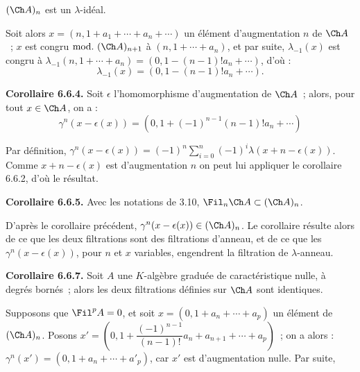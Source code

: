 \((\Ch A)_n\) est un \(\lambda\)-idéal.

Soit alors \(x=(n,1+a_1+\cdots+a_n+\cdots)\) un élément d'augmentation \(n\) de \(\Ch A\)~; \(x\) est congru \(\mathrm{mod.}\ (\Ch A)_{n+1}\) à \((n,1+\cdots+a_n)\), et par suite, \(\lambda_{-1}(x)\) est congru à \(\lambda_{-1}(n,1+\cdots+a_n)=(0,1-(n-1)!a_n+\cdots)\), d'où :
\[
  \lambda_{-1}(x)=(0,1-(n-1)!a_n+\cdots).
\]

\textbf{Corollaire 6.6.4.} Soit \(\epsilon\) l'homomorphisme d'augmentation de \(\Ch A\)~; alors, pour tout \(x\in\Ch A\), on a :
\[
  \gamma^n(x-\epsilon(x))
  =
  (0,1+(-1)^{n-1}(n-1)!a_n+\cdots)
\]

Par définition, \(\gamma^n(x-\epsilon(x))=(-1)^n\sum_{i=0}^n(-1)^i\lambda(x+n-\epsilon(x))\). Comme \(x+n-\epsilon(x)\) est d'augmentation \(n\) on peut lui appliquer le corollaire 6.6.2, d'où le résultat.

\textbf{Corollaire 6.6.5.} Avec les notations de 3.10, \(\Fil_n\Ch A\subset(\Ch A)_n\).

D'après le corollaire précédent, \(\gamma^n(x-\epsilon(x))\in(\Ch A)_n\). Le corollaire résulte alors de ce que les deux filtrations sont des filtrations d'anneau, et de ce que les \(\gamma^n(x-\epsilon(x))\), pour \(n\) et \(x\) variables, engendrent la filtration de \(\lambda\)-anneau.

\textbf{Corollaire 6.6.7.} Soit \(A\) une \(K\)-algèbre graduée de caractéristique nulle, à degrés bornés~; alors les deux filtrations définies sur \(\Ch A\) sont identiques.

Supposons que \(\Fil^pA=0\), et soit \(x=(0,1+a_n+\cdots+a_p)\) un élément de \((\Ch A)_n\). Posons \(x'=\left(0,1+\dfrac{(-1)^{n-1}}{(n-1)!}a_n+a_{n+1}+\cdots+a_p\right)\)~; on a alors :
\(\gamma^n(x')=(0,1+a_n+\cdots+a'_p)\), car \(x'\) est d'augmentation nulle. Par suite, 
